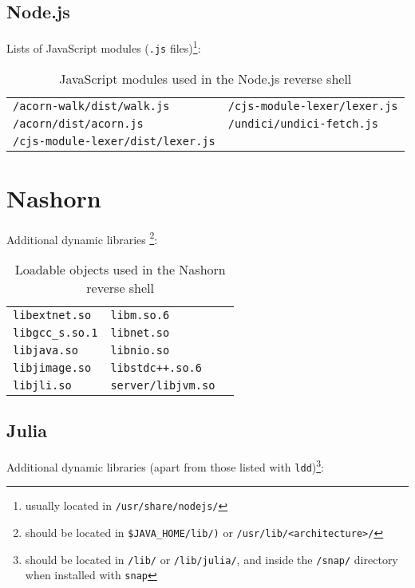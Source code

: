 \subsection*{Node.js}


Lists of JavaScript modules (\texttt{.js} files)\footnote{usually located in \texttt{/usr/share/nodejs/}}:

\begin{longtable}{l l}
\caption{JavaScript modules used in the Node.js reverse shell}\label{tab:node-dpd} \\
\texttt{/acorn-walk/dist/walk.js} & \texttt{/cjs-module-lexer/lexer.js} \\
\texttt{/acorn/dist/acorn.js} & \texttt{/undici/undici-fetch.js} \\
\texttt{/cjs-module-lexer/dist/lexer.js} & \\
\end{longtable}


\section*{Nashorn}


Additional dynamic libraries \footnote{should be located in \texttt{\$JAVA\_HOME/lib/)} or \texttt{/usr/lib/<architecture>/}}:

\begin{longtable}{l l l}
\caption{Loadable objects used in the Nashorn reverse shell}\label{tab:nashorn-dpd} \\
\texttt{libextnet.so} & \texttt{libm.so.6} \\
\texttt{libgcc\_s.so.1} & \texttt{libnet.so} \\
\texttt{libjava.so} & \texttt{libnio.so} \\
\texttt{libjimage.so} & \texttt{libstdc++.so.6} \\
\texttt{libjli.so} & \texttt{server/libjvm.so} \\
\end{longtable}


\subsection*{Julia}


Additional dynamic libraries (apart from those listed with \texttt{ldd})\footnote{should be located in \texttt{/lib/} or \texttt{/lib/julia/}, and inside the \texttt{/snap/} directory when installed with \texttt{snap}}:

